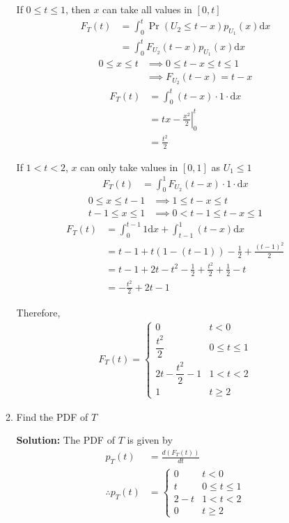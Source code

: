 \documentclass[journal,12pt,twocolumn]{IEEEtran}
\newcommand{\solution}{\noindent \textbf{Solution: }}
\providecommand{\pr}[1]{\ensuremath{\Pr\left(#1\right)}}
\providecommand{\der}[1]{\mathrm{d} #1}
\numberwithin{equation}{section}
\renewcommand\thesection{\arabic{section}}
\begin{document}
\begin{enumerate}[label=\thesection.\arabic*,ref=\thesection.\theenumi]
\begin{enumerate}[label=\thesection.\arabic*,ref=\thesection.\theenumi]
	If $0 \le t \le 1$, then $x$ can take all values in $[0,t]$
	\begin{align}
		F_T(t)	&= \int_0^t \pr{U_2 \le t - x} p_{U_1}(x) \der{x} \\
		&= \int_0^t F_{U_2}(t-x) p_{U_1}(x) \der{x}
	\end{align}
	\begin{align}
		0 \le x \le t &\implies 0 \le t - x \le t \le 1 \\
		&\implies F_{U_2}(t-x) = t - x
	\end{align}
	\begin{align}
		F_T(t) &= \int_0^t (t-x) \cdot 1 \cdot \der{x} \\
		&= \left. tx - \frac{x^2}{2} \right|_0^t \\
		&= \frac{t^2}{2}
	\end{align}
	
	If $1 < t < 2$, $x$ can only take values in $[0,1]$ as $U_1 \le 1$
	\begin{align}
		F_T(t)	&= \int_0^1 F_{U_2}(t-x) \cdot 1 \cdot \der{x} 
	\end{align}
	\begin{align}
		0 \le x \le t - 1 &\implies 1 \le t - x \le t \\
		t - 1 \le x \le 1 &\implies 0 < t - 1 \le t - x \le 1
	\end{align}
	\begin{align}
		F_T(t) &= \int_0^{t-1} 1 \der{x} + \int_{t-1}^1 (t-x)\der{x} \\
		&= t - 1 + t(1 - (t - 1)) - \frac{1}{2} + \frac{(t-1)^2}{2} \\
		&= t - 1 + 2t - t^2 -\frac{1}{2} + \frac{t^2}{2} + \frac{1}{2} - t \\ 
		&= -\frac{t^2}{2} + 2t - 1
	\end{align}
	
	Therefore,
	\begin{align}
		F_T(t) = 
		\begin{cases}
		0 & t < 0 \\
		\dfrac{t^2}{2} & 0 \le t \le 1 \\
		 2t -\dfrac{t^2}{2} - 1 & 1 < t < 2 \\
		1 & t \ge 2
		\end{cases}
	\end{align}
	
		
	
	\item Find the PDF of $T$
	
	\solution The PDF of $T$ is given by
	\begin{align}
		p_T(t) &= \frac{d(F_{T}(t))}{dt} \\
		\therefore p_T(t) &=
		\begin{cases}
			0 & t < 0 \\
			t & 0 \le t \le 1 \\
			2 - t & 1 < t < 2 \\
			0 & t \ge 2
		\end{cases}
	\end{align}
	

\end{enumerate}
\end{enumerate}
\end{document}
